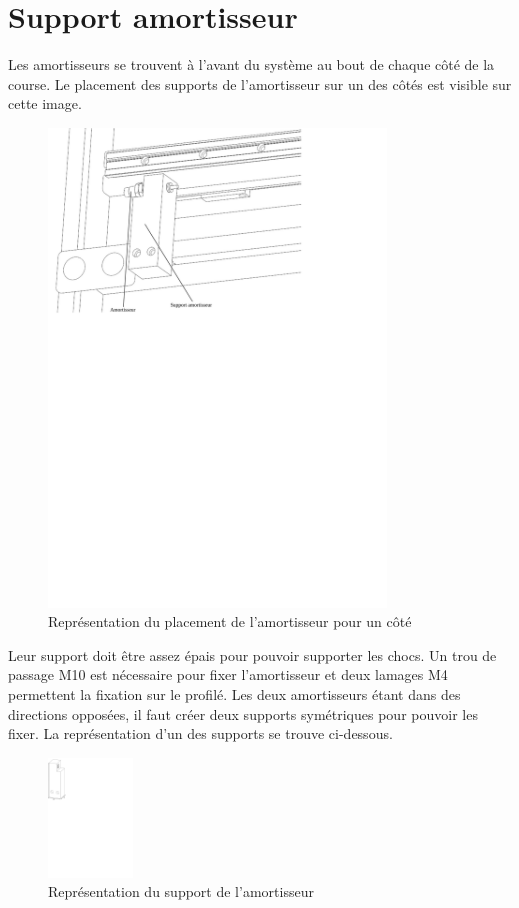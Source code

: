 \section{Support amortisseur}\label{sec:SupAmort}
Les amortisseurs se trouvent à l'avant du système au bout de chaque côté de la course. Le placement des supports de l'amortisseur sur un des
côtés est visible sur cette image.

\begin{figure}[H]
    \centering
    \includegraphics[width = 0.8\textwidth]{assets/figures/PlacementSupports.svg}
    \caption{Représentation du placement de l'amortisseur pour un côté}
    \label{fig:PlaceSup}
\end{figure}

Leur support doit être assez épais pour pouvoir supporter les chocs. Un trou de passage M10 est nécessaire pour fixer l'amortisseur et deux
lamages M4 permettent la fixation sur le profilé. Les deux amortisseurs étant dans des directions opposées, il faut créer deux supports
symétriques pour pouvoir les fixer. La représentation d'un des supports se trouve ci-dessous.

\begin{figure}[H]
    \centering
    \includegraphics[width = 0.2\textwidth]{assets/figures/SupportAmortisseur.svg}
    \caption{Représentation du support de l'amortisseur}
    \label{fig:SupAmort}
\end{figure}

